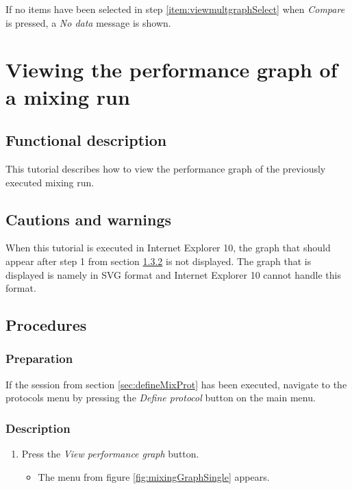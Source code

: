 If no items have been selected in step \ref{item:viewmultgraphSelect} when \emph{Compare} is pressed, a \emph{No data} message is shown.


\section{Viewing the performance graph of a mixing run}\label{sec:viewsinglegraph}

\subsection{Functional description}
This tutorial describes how to view the performance graph of the previously executed mixing run.

\subsection{Cautions and warnings}
When this tutorial is executed in Internet Explorer 10, the graph that should appear after step 1 from section  \ref{subsubsec:viewsinglegraphDesc} is not displayed. The graph that is displayed is namely in SVG format and Internet Explorer 10 cannot handle this format.

\subsection{Procedures}

\subsubsection{Preparation}
If the session from section \ref{sec:defineMixProt} has been executed, navigate to the protocols menu by pressing the \emph{Define protocol} button on the main menu.

\subsubsection{Description}\label{subsubsec:viewsinglegraphDesc}
\begin{enumerate}
	\item Press the \emph{View performance graph} button.
		\begin{itemize}
			\item The menu from figure \ref{fig:mixingGraphSingle} appears.
		\end{itemize}	
\end{enumerate}

